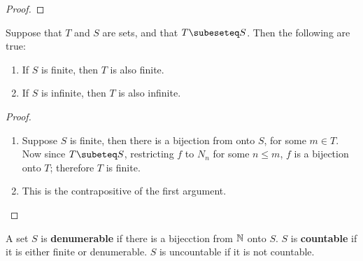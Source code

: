 \begin{proof}
\end{proof}

\begin{theorem}
    Suppose that $T$ and  $S$ are sets, and that  $T \subeseteq S$. Then the following are true:
        \begin{enumerate}[label=(\arabic*)]
            \item If $S$ is finite, then $T$ is also finite.

            \item If $S$ is infinite, then $T$ is also infinite.
        \end{enumerate}
\end{theorem}
\begin{proof}
    \begin{enumerate}[label=(\arabic*)]
        \item Suppose $S$ is finite, then there is a bijection from  onto $S$, for some  $m \in T$. Now since $T \subeteq S$, 
            restricting $f$ to  $N_n$ for some $n \leq m$,  $f$ is a bijection onto  $T$; therefore  $T$ is finite.

        \item This is the contrapositive of the first argument.
    \end{enumerate}		
\end{proof}

\begin{definition}
    A set $S$ is \textbf{denumerable} if there is a bijecction from $\mathbb{N}$ onto  $S$.  $S$ is \textbf{countable} if it is either 
    finite or denumerable. $S$ is uncountable if it is not countable.
\end{definition}


